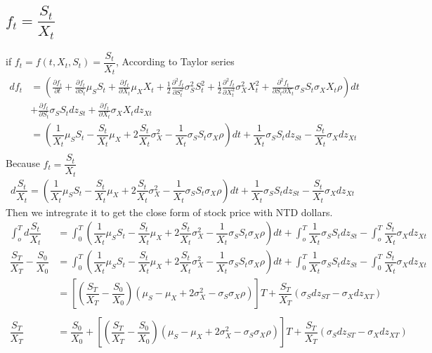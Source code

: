\documentclass[12pt]{article}
\begin{document}
\subsection{$f_t = \dfrac{S_t}{X_t}$}
if $f_t = f(t, X_t, S_t) = \dfrac{S_t}{X_t}$, According to Taylor series
\begin{align*}
    df_t &= (\frac{\partial f_t}{\partial t} + \frac{\partial f_t}{\partial S_t}\mu_S S_t + \frac{\partial f_t}{\partial X_t}\mu_X X_t + \frac{1}{2}\frac{\partial^2 f_t}{\partial S_t^2}\sigma^2_S S_t^2 + \frac{1}{2}\frac{\partial^2 f_t}{\partial X_t^2}\sigma^2_X X_t^2 + \frac{\partial^2 f_t}{\partial S_t \partial X_t}\sigma_S S_t \sigma_X X_t \rho)dt \\
    &+ \frac{\partial f_t}{\partial S_t}\sigma_S S_t dz_{St} + \frac{\partial f_t}{\partial X_t}\sigma_X X_t dz_{Xt}\\
    &= (\dfrac{1}{X_t}\mu_S S_t - \dfrac{S_t}{X_t} \mu_X + 2\dfrac{S_t}{X_t}\sigma^2_X -\dfrac{1}{X_t}\sigma_S S_t \sigma_X\rho)dt + \dfrac{1}{X_t} \sigma_S S_t dz_{St} -\dfrac{S_t}{X_t} \sigma_X dz_{Xt}\\
\end{align*}
Because $f_t = \dfrac{S_t}{X_t}$
\begin{align*}
    d\dfrac{S_t}{X_t} = (\dfrac{1}{X_t}\mu_S S_t - \dfrac{S_t}{X_t} \mu_X + 2\dfrac{S_t}{X_t}\sigma^2_X -\dfrac{1}{X_t}\sigma_S S_t \sigma_X\rho)dt + \dfrac{1}{X_t} \sigma_S S_t dz_{St} -\dfrac{S_t}{X_t} \sigma_X dz_{Xt}
\end{align*}
Then we intregrate it to get the close form of stock price with NTD dollars.
\begin{align*}
    \int_o^T d\dfrac{S_t}{X_t} &= \int_0^T (\dfrac{1}{X_t}\mu_S S_t - \dfrac{S_t}{X_t} \mu_X + 2\dfrac{S_t}{X_t}\sigma^2_X -\dfrac{1}{X_t}\sigma_S S_t \sigma_X\rho)dt + \int_o^T \dfrac{1}{X_t} \sigma_S S_t dz_{St} -\int_o^T \dfrac{S_t}{X_t} \sigma_X dz_{Xt}\\
    \dfrac{S_T}{X_T}-\dfrac{S_0}{X_0} &= \int_0^T(\dfrac{1}{X_t}\mu_S S_t - \dfrac{S_t}{X_t} \mu_X + 2\dfrac{S_t}{X_t}\sigma^2_X -\dfrac{1}{X_t}\sigma_S S_t \sigma_X\rho)dt + \int_0^T \dfrac{1}{X_t} \sigma_S S_t dz_{St} -\int_0^T \dfrac{S_t}{X_t} \sigma_X dz_{Xt}\\
    &= [(\dfrac{S_T}{X_T}-\dfrac{S_0}{X_0})(\mu_S - \mu_X + 2\sigma^2_X -\sigma_S\sigma_X\rho)]T + \dfrac{S_T}{X_T}(\sigma_S dz_{ST} - \sigma_X dz_{XT})\\\\
    \dfrac{S_T}{X_T} &= \dfrac{S_0}{X_0} + [(\dfrac{S_T}{X_T}-\dfrac{S_0}{X_0})(\mu_S - \mu_X + 2\sigma^2_X -\sigma_S\sigma_X\rho)]T + \dfrac{S_T}{X_T}(\sigma_S dz_{ST} - \sigma_X dz_{XT})
\end{align*}
\end{document}
